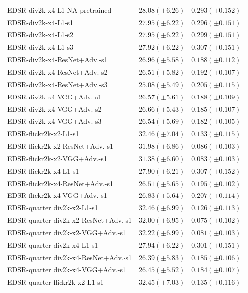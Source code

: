 \documentclass[10pt]{article} %
\begin{document}
\begin{longtable}{| p{} | p{} | p{} |}
EDSR-div2k-x4-L1-NA-pretrained & $28.08 (\pm 6.26)$ & $0.293 (\pm 0.152)$ \\
EDSR-div2k-x4-L1-s1 & $27.95 (\pm 6.22)$ & $0.296 (\pm 0.151)$ \\
EDSR-div2k-x4-L1-s2 & $27.95 (\pm 6.22)$ & $0.299 (\pm 0.151)$ \\
EDSR-div2k-x4-L1-s3 & $27.92 (\pm 6.22)$ & $0.307 (\pm 0.151)$ \\
EDSR-div2k-x4-ResNet+Adv.-s1 & $26.96 (\pm 5.58)$ & $0.188 (\pm 0.112)$ \\
EDSR-div2k-x4-ResNet+Adv.-s2 & $26.51 (\pm 5.82)$ & $0.192 (\pm 0.107)$ \\
EDSR-div2k-x4-ResNet+Adv.-s3 & $25.08 (\pm 5.49)$ & $0.205 (\pm 0.115)$ \\
EDSR-div2k-x4-VGG+Adv.-s1 & $26.57 (\pm 5.61)$ & $0.188 (\pm 0.109)$ \\
EDSR-div2k-x4-VGG+Adv.-s2 & $26.66 (\pm 5.43)$ & $0.185 (\pm 0.107)$ \\
EDSR-div2k-x4-VGG+Adv.-s3 & $26.54 (\pm 5.69)$ & $0.182 (\pm 0.105)$ \\
EDSR-flickr2k-x2-L1-s1 & $32.46 (\pm 7.04)$ & $0.133 (\pm 0.115)$ \\
EDSR-flickr2k-x2-ResNet+Adv.-s1 & $31.98 (\pm 6.86)$ & $0.086 (\pm 0.103)$ \\
EDSR-flickr2k-x2-VGG+Adv.-s1 & $31.38 (\pm 6.60)$ & $0.083 (\pm 0.103)$ \\
EDSR-flickr2k-x4-L1-s1 & $27.90 (\pm 6.21)$ & $0.307 (\pm 0.152)$ \\
EDSR-flickr2k-x4-ResNet+Adv.-s1 & $26.51 (\pm 5.65)$ & $0.195 (\pm 0.102)$ \\
EDSR-flickr2k-x4-VGG+Adv.-s1 & $26.83 (\pm 5.64)$ & $0.207 (\pm 0.114)$ \\
EDSR-quarter div2k-x2-L1-s1 & $32.46 (\pm 6.99)$ & $0.126 (\pm 0.113)$ \\
EDSR-quarter div2k-x2-ResNet+Adv.-s1 & $32.00 (\pm 6.95)$ & $0.075 (\pm 0.102)$ \\
EDSR-quarter div2k-x2-VGG+Adv.-s1 & $32.22 (\pm 6.99)$ & $0.081 (\pm 0.103)$ \\
EDSR-quarter div2k-x4-L1-s1 & $27.94 (\pm 6.22)$ & $0.301 (\pm 0.151)$ \\
EDSR-quarter div2k-x4-ResNet+Adv.-s1 & $26.39 (\pm 5.83)$ & $0.185 (\pm 0.106)$ \\
EDSR-quarter div2k-x4-VGG+Adv.-s1 & $26.45 (\pm 5.52)$ & $0.184 (\pm 0.107)$ \\
EDSR-quarter flickr2k-x2-L1-s1 & $32.45 (\pm 7.03)$ & $0.135 (\pm 0.116)$ \\

\end{longtable}
\end{document}
